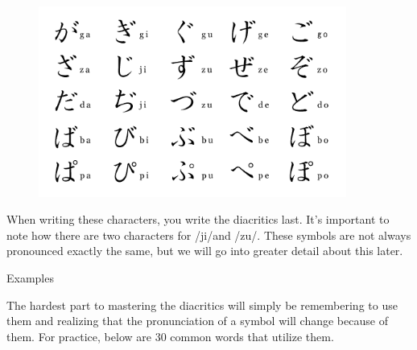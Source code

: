 \begin{figure}[h]
\centering

\includegraphics[width=0.9\textwidth]{figs/第01章/第3課:_hiragana_fig/Hiragana_dakuten_chart.png}

\end{figure}
\hfill\break

\par{ When writing these characters, you write the diacritics last. It's important to note how there are two characters for \slash ji\slash  and \slash zu\slash . These symbols are not always pronounced exactly the same, but we will go into greater detail about this later. }

\begin{center}
Examples 
\end{center}

\par{ The hardest part to mastering the diacritics will simply be remembering to use them and realizing that the pronunciation of a symbol will change because of them. For practice, below are 30 common words that utilize them. }

